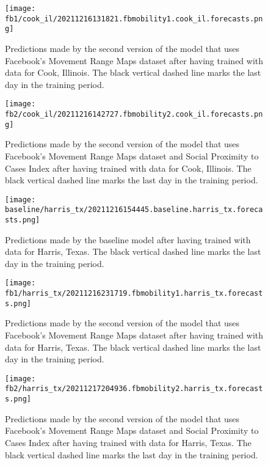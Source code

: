 \begin{figure}[!htb]
    \centering
    \texttt{[image: fb1/cook\_il/20211216131821.fbmobility1.cook\_il.forecasts.png]}
    \caption{Predictions made by the second version of the model that uses Facebook's Movement Range Maps dataset after having trained with data for Cook, Illinois. The black vertical dashed line marks the last day in the training period.}
    \label{fig:predictions-cook-fb1}
\end{figure}

\begin{figure}[!htb]
    \centering
    \texttt{[image: fb2/cook\_il/20211216142727.fbmobility2.cook\_il.forecasts.png]}
    \caption{Predictions made by the second version of the model that uses Facebook's Movement Range Maps dataset and Social Proximity to Cases Index after having trained with data for Cook, Illinois. The black vertical dashed line marks the last day in the training period.}
    \label{fig:predictions-cook-fb2}
\end{figure}


\begin{figure}[!htb]
    \centering
    \texttt{[image: baseline/harris\_tx/20211216154445.baseline.harris\_tx.forecasts.png]}
    \caption{Predictions made by the baseline model after having trained with data for Harris, Texas. The black vertical dashed line marks the last day in the training period.}
    \label{fig:predictions-harris-baseline}
\end{figure}

\begin{figure}[!htb]
    \centering
    \texttt{[image: fb1/harris\_tx/20211216231719.fbmobility1.harris\_tx.forecasts.png]}
    \caption{Predictions made by the second version of the model that uses Facebook's Movement Range Maps dataset after having trained with data for Harris, Texas. The black vertical dashed line marks the last day in the training period.}
    \label{fig:predictions-harris-fb1}
\end{figure}

\begin{figure}[!htb]
    \centering
    \texttt{[image: fb2/harris\_tx/20211217204936.fbmobility2.harris\_tx.forecasts.png]}
    \caption{Predictions made by the second version of the model that uses Facebook's Movement Range Maps dataset and Social Proximity to Cases Index after having trained with data for Harris, Texas. The black vertical dashed line marks the last day in the training period.}
    \label{fig:predictions-harris-fb2}
\end{figure}

